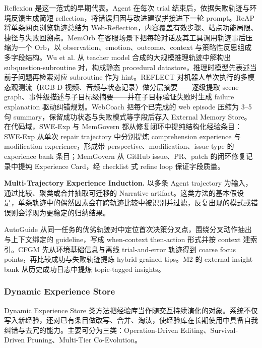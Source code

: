 Reflexion \cite{Shi23b} 是这一范式的早期代表。Agent 在每次 trial 结束后，依据失败轨迹与环境反馈生成简短 reflection，将错误归因与改进建议拼接进下一轮 prompt。ReAP \cite{Aza25} 将单条网页浏览轨迹总结为 Web-Reflection，内容覆盖有效步骤、站点功能局限、捷径与失败回溯点。MemOrb \cite{Hua25} 在客服场景下把每轮对话及其工具调用轨迹事后压缩为一个 Orb，以 observation、emotion、outcome、context 与策略性反思组成多字段结构。Wu et al. \cite{Wu26} 从 teacher model 合成的大规模推理轨迹中解构出 subquestion-subroutine 对，构成静态 procedural datastore，推理时模型先表述当前子问题再检索对应 subroutine 作为 hint。REFLECT \cite{Liu23} 对机器人单次执行的多模态观测流（RGB-D 视频、音频与状态记录）做分层摘要——逐级提取 scene graph、事件级描述与子目标级摘要——并在子目标验证失败时生成 failure explanation 驱动纠错规划。WebCoach \cite{Liu25e} 把每个已完成的 web episode 压缩为 3–5 句 summary，保留成功状态与失败模式等字段后存入 External Memory Store。在代码域，SWE-Exp \cite{Che25d} 与 MemGovern \cite{Wan26ap} 都从修复闭环中提纯结构化经验条目：SWE-Exp 从单次 repair trajectory 中分别提炼 comprehension experience 与 modification experience，形成带 perspective、modification、issue type 的 experience bank 条目；MemGovern 从 GitHub issue、PR、patch 的闭环修复记录中提纯 Experience Card，经 checklist 式 refine loop 保证字段质量。


\textbf{Multi-Trajectory Experience Induction.} 以多条 Agent trajectory 为输入，通过比较、聚类或合并抽取可迁移的 Narrative artifact。这类方法的基本假设是，单条轨迹中的偶然因素会在跨轨迹比较中被识别并过滤，反复出现的模式或错误则会浮现为更稳定的归纳结果。

AutoGuide \cite{Fu24} 从同一任务的优劣轨迹对中定位首次决策分叉点，围绕分叉动作抽出与上下文绑定的 guideline，写成 when-context then-action 形式并按 context 建索引。CFGM \cite{Yan25} 先从环境基础信息与离线 trial-and-error 轨迹得到 coarse focus points，再比较成功与失败轨迹提炼 hybrid-grained tips。M2 \cite{Yan26b} 的 external insight bank 从历史成功日志中提炼 topic-tagged insights。


\subsubsection{Dynamic Experience Store}

Dynamic Experience Store 类方法把经验库当作随交互持续演化的对象。系统不仅写入新经验，还对已有条目做改写、合并、淘汰，使经验库在长期使用中具备自我纠错与去冗的能力。主要可分为三类：Operation-Driven Editing、Survival-Driven Pruning、Multi-Tier Co-Evolution。

